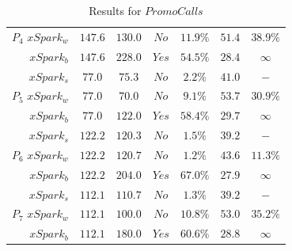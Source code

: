 \begin{table}[tbhp]
\begin{tabular}{r|c|c|c|c|c|c}
		$P_4 \,\,xSpark_w$  & $147.6$   & $130.0$   & $No$   & $11.9\%$   & $51.4$   & $38.9\%$  \\
		$xSpark_b$  & $147.6$   & $228.0$   & $Yes$   & $54.5\%$   & $28.4$   & $\infty$  \\
		\midrule
		$xSpark_s$  & $77.0$   & $75.3$   & $No$   & $2.2\%$   & $41.0$   & $-$  \\
		$P_5 \,\,xSpark_w$  & $77.0$   & $70.0$   & $No$   & $9.1\%$   & $53.7$   & $30.9\%$  \\
		$xSpark_b$  & $77.0$   & $122.0$   & $Yes$   & $58.4\%$   & $29.7$   & $\infty$  \\
		\midrule
		$xSpark_s$  & $122.2$   & $120.3$   & $No$   & $1.5\%$   & $39.2$   & $-$  \\
		$P_6 \,\,xSpark_w$  & $122.2$   & $120.7$   & $No$   & $1.2\%$   & $43.6$   & $11.3\%$  \\
		$xSpark_b$  & $122.2$   & $204.0$   & $Yes$   & $67.0\%$   & $27.9$   & $\infty$  \\
		\midrule
		$xSpark_s$  & $112.1$   & $110.7$   & $No$   & $1.3\%$   & $39.2$   & $-$  \\
		$P_7 \,\,xSpark_w$  & $112.1$   & $100.0$   & $No$   & $10.8\%$   & $53.0$   & $35.2\%$  \\
		$xSpark_b$  & $112.1$   & $180.0$   & $Yes$   & $60.6\%$   & $28.8$   & $\infty$  \\
		
		\bottomrule
	\end{tabular}
	\caption{Results for \boldmath$PromoCalls$}
	\label{Table:PerfPromo}
\end{table}


